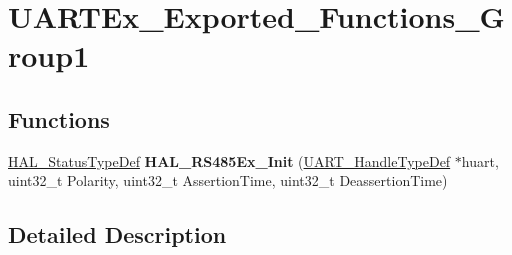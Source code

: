 \hypertarget{group___u_a_r_t_ex___exported___functions___group1}{}\section{U\+A\+R\+T\+Ex\+\_\+\+Exported\+\_\+\+Functions\+\_\+\+Group1}
\label{group___u_a_r_t_ex___exported___functions___group1}
\subsection*{Functions}
\begin{DoxyCompactItemize}
\item 
\mbox{\label{group___u_a_r_t_ex___exported___functions___group1_ga27862dc24258939a758a877b674977af}} 
\mbox{\hyperlink{stm32f7xx__hal__def_8h_a63c0679d1cb8b8c684fbb0632743478f}{H\+A\+L\+\_\+\+Status\+Type\+Def}} {\bfseries H\+A\+L\+\_\+\+R\+S485\+Ex\+\_\+\+Init} (\mbox{\hyperlink{group___u_a_r_t___exported___types_ga7adf4f3e4c3ecde572be5925c915a967}{U\+A\+R\+T\+\_\+\+Handle\+Type\+Def}} $\ast$huart, uint32\+\_\+t Polarity, uint32\+\_\+t Assertion\+Time, uint32\+\_\+t Deassertion\+Time)
\end{DoxyCompactItemize}


\subsection{Detailed Description}
